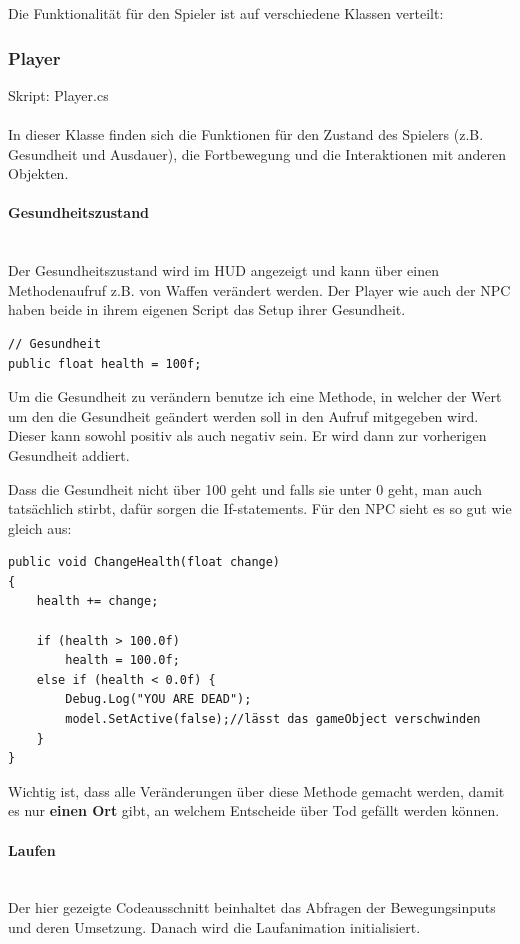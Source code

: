 Die Funktionalität für den Spieler ist auf verschiedene Klassen verteilt:

\subsubsection{Player}
Skript: Player.cs\\\\
In dieser Klasse finden sich die Funktionen für den Zustand des Spielers (z.B. Gesundheit und Ausdauer), die Fortbewegung und die Interaktionen mit anderen Objekten.

\paragraph{Gesundheitszustand}\mbox{} \\
Der Gesundheitszustand wird im HUD angezeigt und kann über einen Methodenaufruf z.B. von Waffen verändert werden.
Der Player wie auch der NPC haben beide in ihrem eigenen Script das Setup ihrer Gesundheit.
\begin{lstlisting}[caption={Gesundheit als öffentliche Variable}]
// Gesundheit
public float health = 100f;
\end{lstlisting}
Um die Gesundheit zu verändern benutze ich eine Methode, in welcher der Wert um den die Gesundheit geändert werden soll in den Aufruf mitgegeben wird. Dieser kann sowohl positiv als auch negativ sein.
Er wird dann zur vorherigen Gesundheit addiert.

Dass die Gesundheit nicht über 100 geht und falls sie unter 0 geht, man auch tatsächlich stirbt, dafür sorgen die If-statements. Für den NPC sieht es so gut wie gleich aus:
\begin{lstlisting}
public void ChangeHealth(float change)
{
	health += change;

	if (health > 100.0f)
		health = 100.0f;
	else if (health < 0.0f) {
		Debug.Log("YOU ARE DEAD");
		model.SetActive(false);//lässt das gameObject verschwinden
	}
}
\end{lstlisting}
Wichtig ist, dass alle Veränderungen über diese Methode gemacht werden, damit es nur \textbf{einen Ort} gibt, an welchem Entscheide über Tod gefällt werden können.

\paragraph{Laufen}\mbox{} \\
Der hier gezeigte Codeausschnitt beinhaltet das Abfragen der Bewegungsinputs und deren Umsetzung.
Danach wird die Laufanimation initialisiert.


